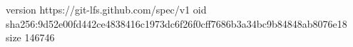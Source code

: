 version https://git-lfs.github.com/spec/v1
oid sha256:9d52e00fd442ce4838416c1973dc6f26f0cff7686b3a34bc9b84848ab8076e18
size 146746
